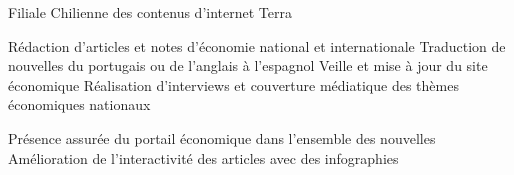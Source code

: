 \documentclass[30pt, french]{tccv}
\begin{document}
\begin{upshape}
\begin{textblock}{13.3}
\begin{mdframed}
\begin{eventlist}
 Filiale Chilienne des contenus d’internet Terra  \\
  
\setlength{\parskip}{-10pt}
\begin{itemize}
      \setlength\itemsep{-3pt} 
      \cvitem[\checkmark] Rédaction d'articles et notes d’économie national et internationale
      \cvitem[\checkmark] Traduction de nouvelles du portugais ou de l'anglais à l'espagnol
      \cvitem[\checkmark] Veille et mise à jour du site économique
      \cvitem[\checkmark] Réalisation d'interviews et couverture médiatique des thèmes économiques nationaux
\end{itemize}        

 Présence assurée du portail économique dans l’ensemble des nouvelles \\
\makebox[1.4cm][l]{}           Amélioration de l’interactivité des articles avec des infographies

   


\end{eventlist}


\end{mdframed}
\end{textblock}

\end{upshape}
\end{document}
